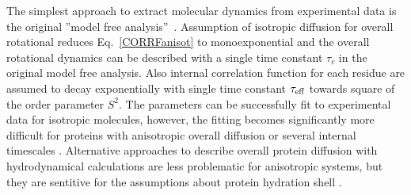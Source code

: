 \documentclass[pre,aps,floatfix,authordate1-4,twocolumn]{revtex4-1}
\begin{document}
The simplest approach to extract molecular dynamics from experimental
data is the original ''model free analysis''~\cite{Lipari82}. Assumption of isotropic diffusion for
overall rotational reduces Eq.~\ref{CORRFanisot} to monoexponential and the overall rotational
dynamics can be described with a single time constant $\tau_c$ in the
original model free analysis. Also internal correlation
function for each residue are assumed to decay exponentially with single time constant $\tau_{\rm eff}$
towards square of the order parameter $S^2$. The parameters can be
successfully fit to experimental data for isotropic molecules,
however, the fitting becomes significantly more difficult for proteins 
with anisotropic overall diffusion or several internal timescales \cite{dosset00,luginbuhl97,jarymowycz06}.
Alternative approaches to describe overall protein diffusion with hydrodynamical
calculations are less problematic for anisotropic systems, but they
are sentitive for the assumptions about protein hydration shell \cite{torre00}.





\end{document}
